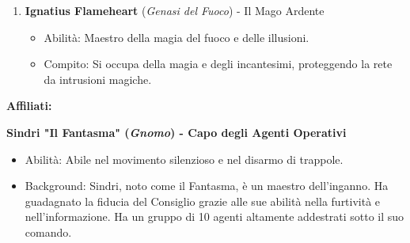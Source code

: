 \documentclass{article}
\begin{document}
\begin{enumerate}
  \item \textbf{Ignatius Flameheart} (\textit{Genasi del Fuoco}) - Il Mago Ardente
    \begin{itemize}
      \item Abilità: Maestro della magia del fuoco e delle illusioni.
      \item Compito: Si occupa della magia e degli incantesimi, proteggendo la rete da intrusioni magiche.
    \end{itemize}
\end{enumerate}

\textbf{Affiliati:}

\textbf{Sindri "Il Fantasma" (\textit{Gnomo}) - Capo degli Agenti Operativi}
\begin{itemize}
  \item Abilità: Abile nel movimento silenzioso e nel disarmo di trappole.
  \item Background: Sindri, noto come il Fantasma, è un maestro dell'inganno. Ha guadagnato la fiducia del Consiglio grazie alle sue abilità nella furtività e nell'informazione. Ha un gruppo di 10 agenti altamente addestrati sotto il suo comando.
\end{itemize}
\end{document}
